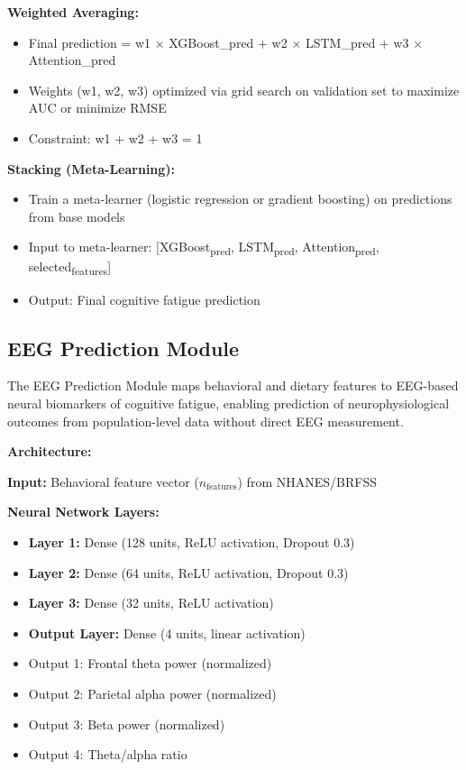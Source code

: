 \documentclass[journal,twoside,10pt]{IEEEtran}
\begin{document}
\textbf{Weighted Averaging:}
\begin{itemize}
\item Final prediction = w1 $\times$ XGBoost\_pred + w2 $\times$ LSTM\_pred + w3 $\times$ Attention\_pred
\item Weights (w1, w2, w3) optimized via grid search on validation set to maximize AUC or minimize RMSE
\item Constraint: w1 + w2 + w3 = 1
\end{itemize}

\textbf{Stacking (Meta-Learning):}
\begin{itemize}
\item Train a meta-learner (logistic regression or gradient boosting) on predictions from base models
\item Input to meta-learner: [XGBoost\textsubscript{pred}, LSTM\textsubscript{pred}, Attention\textsubscript{pred}, selected\textsubscript{features}]
\item Output: Final cognitive fatigue prediction
\end{itemize}

\subsection{EEG Prediction Module}

The EEG Prediction Module maps behavioral and dietary features to EEG-based neural biomarkers of cognitive fatigue, enabling prediction of neurophysiological outcomes from population-level data without direct EEG measurement.

\textbf{Architecture:}

\textbf{Input:} Behavioral feature vector ($n_{\text{features}}$) from NHANES/BRFSS

\textbf{Neural Network Layers:}
\begin{itemize}
\item \textbf{Layer 1:} Dense (128 units, ReLU activation, Dropout 0.3)
\item \textbf{Layer 2:} Dense (64 units, ReLU activation, Dropout 0.3)
\item \textbf{Layer 3:} Dense (32 units, ReLU activation)
\item \textbf{Output Layer:} Dense (4 units, linear activation)
\item Output 1: Frontal theta power (normalized)
\item Output 2: Parietal alpha power (normalized)
\item Output 3: Beta power (normalized)
\item Output 4: Theta/alpha ratio
\end{itemize}
\end{document}
